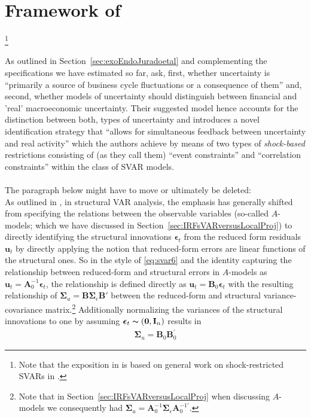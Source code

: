 \documentclass[a4paper,11pt,listof=nochaptergap,oneside,pointednumbers,bibtotoc,bigheadings,liststotoc]{scrbook}
\theoremstyle{mysatz}
\theoremstyle{mydefinition}
\theoremstyle{mybemerkung}
\newcommand{\vect}[1]{\boldsymbol{\mathbf{#1}}}
\begin{document}
\section{Framework of \citet{ludvigsonetal:18}}\footnote{Note that the exposition in \citet{ludvigsonetal:18} is based on general work on shock-restricted SVARs in \citet{ludvigsonetal:17}.}

As outlined in Section~\ref{sec:exoEndoJuradoetal} and complementing the specifications we have estimated so far, \citet[p. 2]{ludvigsonetal:18} ask, first, whether uncertainty is ``primarily a source of business cycle fluctuations or a consequence of them'' and, second, whether models of uncertainty should distinguish between financial and 'real' macroeconomic uncertainty. Their suggested model hence accounts for the distinction between both, types of uncertainty and introduces a novel identification strategy that ``allows for simultaneous feedback between uncertainty and real activity'' which the authors achieve by means of two types of \textit{shock-based} restrictions consisting of (as they call them) ``event constraints'' and ``correlation constraints'' within the class of SVAR models.\\
\\
The paragraph below might have to move or ultimately be deleted:\\
As outlined in \citet{lutkepohl:05}, in structural VAR analysis, the emphasis has generally shifted from specifying the relations between the observable variables (so-called $A$-models; which we have discussed in Section~\ref{sec:IRFsVARversusLocalProj}) to directly identifying the structural innovations $\vect{\epsilon}_t$ from the reduced form residuals $\vect{u}_t$ by directly applying the notion that reduced-form errors are linear functions of the structural ones. So in the style of \ref{eq:svar6} and the identity capturing the relationship between reduced-form and structural errors in $A$-models as $\vect{u}_t = \vect{A}_0^{-1}\vect{\epsilon}_t$, the relationship is defined directly as $\vect{u}_t = \vect{B}_0\vect{\epsilon}_t$ with the resulting relationship of $\vect{\Sigma}_u = \vect{B}\vect{\Sigma}_\epsilon\vect{B}'$ between the reduced-form and structural variance-covariance matrix.\footnote{Note that in Section~\ref{sec:IRFsVARversusLocalProj} when discussing $A$-models we consequently had $\vect{\Sigma}_u = \vect{A}_0^{-1}\vect{\Sigma}_\epsilon\vect{A}_0^{-1'}$.} Additionally normalizing the variances of the structural innovations to one by assuming $\vect{\epsilon}_t  \thicksim (\vect{0}, \vect{I}_n)$ results in 
	\begin{equation} \label{eq:svar_ludvig2}
	\begin{split}
		\vect{\Sigma}_u = \vect{B}_0 \vect{B}_0^'
	\end{split}
	\end{equation}
	
\end{document}
